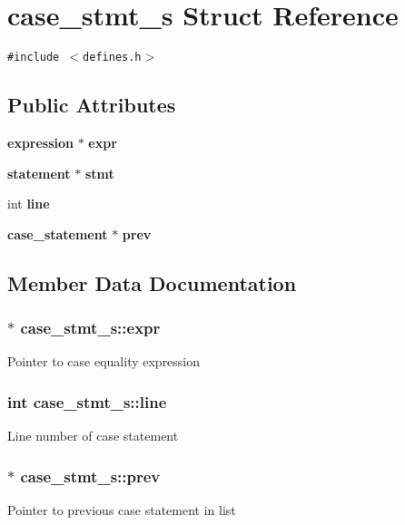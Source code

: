 \section{case\_\-stmt\_\-s Struct Reference}
\label{structcase__stmt__s}
{\tt \#include $<$defines.h$>$}

\subsection*{Public Attributes}
\begin{CompactItemize}
\item 
{\bf expression} $\ast$ {\bf expr}
\item 
{\bf statement} $\ast$ {\bf stmt}
\item 
int {\bf line}
\item 
{\bf case\_\-statement} $\ast$ {\bf prev}
\end{CompactItemize}


\subsection{Member Data Documentation}
\subsubsection{$\ast$ {\bf case\_\-stmt\_\-s::expr}}\label{structcase__stmt__s_o0}


Pointer to case equality expression 
\subsubsection{\setlength{\rightskip}{0pt plus 5cm}int {\bf case\_\-stmt\_\-s::line}}\label{structcase__stmt__s_o2}


Line number of case statement 
\subsubsection{$\ast$ {\bf case\_\-stmt\_\-s::prev}}\label{structcase__stmt__s_o3}


Pointer to previous case statement in list 
